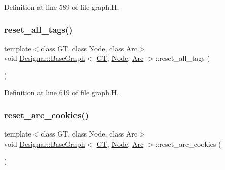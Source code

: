 Definition at line 589 of file graph.\+H.

\mbox{\label{class_designar_1_1_base_graph_ae62e72668468a2aaa3ddc91246e1ee1c}} 
\subsubsection{\texorpdfstring{reset\+\_\+all\+\_\+tags()}{reset\_all\_tags()}}
{\footnotesize\ttfamily template$<$class GT, class Node, class Arc$>$ \\
void \hyperlink{class_designar_1_1_base_graph}{Designar\+::\+Base\+Graph}$<$ \hyperlink{demo-buildgraph_8_c_a3001c40d2c31ca87ed96cd7d1334a55e}{GT}, \hyperlink{namespace_designar_a5af326c65aa2bd26b26c410f2030d09e}{Node}, \hyperlink{namespace_designar_a3f55fb5513d62ff47cbc8f72b8e95d6f}{Arc} $>$\+::reset\+\_\+all\+\_\+tags (\begin{DoxyParamCaption}{ }\end{DoxyParamCaption})\hspace{0.3cm}{\ttfamily [inline]}}



Definition at line 619 of file graph.\+H.

\mbox{\label{class_designar_1_1_base_graph_a44b6cefb8966ed69a0d80bfe7e4546cb}} 
\subsubsection{\texorpdfstring{reset\+\_\+arc\+\_\+cookies()}{reset\_arc\_cookies()}}
{\footnotesize\ttfamily template$<$class GT, class Node, class Arc$>$ \\
void \hyperlink{class_designar_1_1_base_graph}{Designar\+::\+Base\+Graph}$<$ \hyperlink{demo-buildgraph_8_c_a3001c40d2c31ca87ed96cd7d1334a55e}{GT}, \hyperlink{namespace_designar_a5af326c65aa2bd26b26c410f2030d09e}{Node}, \hyperlink{namespace_designar_a3f55fb5513d62ff47cbc8f72b8e95d6f}{Arc} $>$\+::reset\+\_\+arc\+\_\+cookies (\begin{DoxyParamCaption}{ }\end{DoxyParamCaption})\hspace{0.3cm}{\ttfamily [inline]}}



